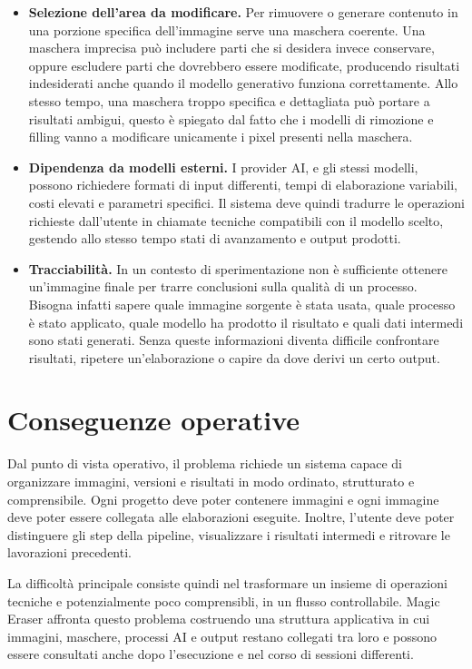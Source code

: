\documentclass[oneside]{supsistudent}
\begin{document}
\begin{itemize}
\item \textbf{Selezione dell'area da modificare.}
Per rimuovere o generare contenuto in una porzione specifica dell'immagine
serve una maschera coerente. Una maschera
imprecisa può includere parti che si desidera invece conservare, oppure escludere parti
che dovrebbero essere modificate, producendo risultati indesiderati anche
quando il modello generativo funziona correttamente.
Allo stesso tempo, una maschera troppo specifica e dettagliata può portare a risultati ambigui,
questo è spiegato dal fatto che i modelli di rimozione e filling vanno a modificare
unicamente i pixel presenti nella maschera.

\item \textbf{Dipendenza da modelli esterni.}
I provider AI, e gli stessi modelli, possono richiedere formati di input
differenti, tempi di elaborazione variabili, costi elevati e parametri specifici.
Il sistema deve quindi tradurre le operazioni richieste dall'utente in chiamate tecniche
compatibili con il modello scelto, gestendo allo stesso tempo stati di avanzamento e
output prodotti.

\item \textbf{Tracciabilità.}
In un contesto di sperimentazione non è sufficiente
ottenere un'immagine finale per trarre conclusioni sulla qualità di un processo.
Bisogna infatti sapere quale immagine sorgente è stata usata, quale processo è stato
applicato, quale modello ha prodotto il risultato e quali dati
intermedi sono stati generati. Senza queste informazioni diventa
difficile confrontare risultati, ripetere un'elaborazione o capire da
dove derivi un certo output.
\end{itemize}

\section{Conseguenze operative}

Dal punto di vista operativo, il problema richiede un sistema capace di
organizzare immagini, versioni e risultati in modo ordinato, strutturato e comprensibile.
Ogni progetto deve poter contenere immagini e ogni immagine deve poter essere
collegata alle elaborazioni eseguite. Inoltre, l'utente deve
poter distinguere gli step della pipeline, visualizzare i risultati intermedi
e ritrovare le lavorazioni precedenti.

La difficoltà principale consiste quindi nel trasformare un insieme di
operazioni tecniche e potenzialmente poco comprensibli, in un flusso
controllabile. Magic Eraser affronta questo problema costruendo una
struttura applicativa in cui immagini, maschere, processi AI e output
restano collegati tra loro e possono essere consultati anche dopo l'esecuzione
e nel corso di sessioni differenti.
\end{document}
